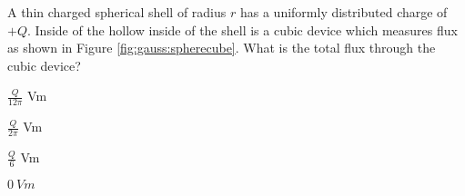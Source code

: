 
\begin{checkpoint}\label{cp:gauss:unitsofflux}
	\begin{MCquestion}{A thin charged spherical shell of radius $r$ has a uniformly distributed charge of $+Q$. Inside of the hollow inside of the shell is a cubic device which measures flux as shown in Figure \ref{fig:gauss:spherecube}. What is the total flux through the cubic device?}
		

		\item $\frac{Q}{12\pi}$ Vm
		
		\item $\frac{Q}{2\pi}$ Vm 
		
		\item $ \frac{Q}{6} $ Vm
		
		\item $ \SI{0}{Vm}$ \correct
	\end{MCquestion}
\end{checkpoint}

